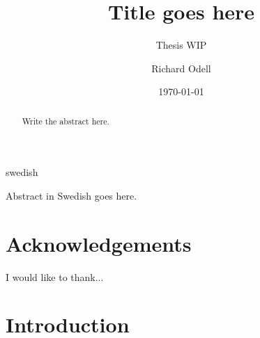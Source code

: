 \documentclass[a4paper,11pt]{kth-mag}
\title{Title goes here}
\subtitle{Thesis WIP}
\author{Richard Odell}
\date{\today}
\begin{document}
\frontmatter
\pagestyle{empty}
\removepagenumbers
\maketitle
{}


\clearpage
\begin{abstract}

Write the abstract here.

\end{abstract}
\clearpage
\begin{foreignabstract}{swedish}

Abstract in Swedish goes here.

\end{foreignabstract}
\clearpage

\chapter*{Acknowledgements}

I would like to thank...




\clearpage
\clearpage
\tableofcontents*
\clearpage
\listoffigures*
\clearpage
\listoftables*
\glsaddall



\mainmatter
\pagestyle{newchap}


\chapter{Introduction}
\end{document}
